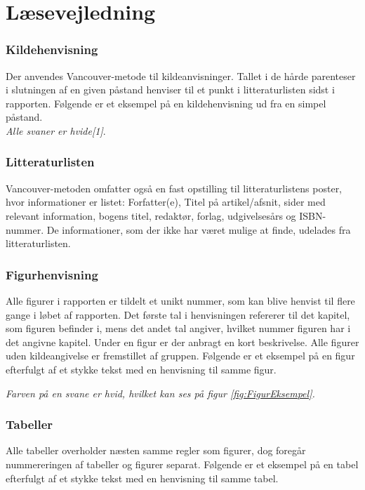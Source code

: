 \section*{Læsevejledning}
\label{sec:laesevejledning}

\subsubsection*{Kildehenvisning}
Der anvendes Vancouver-metode til kildeanvisninger. Tallet i de hårde parenteser i slutningen af en given påstand henviser til et punkt i litteraturlisten sidst i rapporten. Følgende er et eksempel på en kildehenvisning ud fra en simpel påstand.\\

\noindent \textit{Alle svaner er hvide\emph{[1]}}.

\subsubsection*{Litteraturlisten}
Vancouver-metoden omfatter også en fast opstilling til litteraturlistens poster, hvor informationer er listet: Forfatter(e), Titel på artikel/afsnit, sider med relevant information, bogens titel, redaktør, forlag, udgivelsesårs og ISBN-nummer. De informationer, som der ikke har været mulige at finde, udelades fra litteraturlisten.

\subsubsection*{Figurhenvisning}
Alle figurer i rapporten er tildelt et unikt nummer, som kan blive henvist til flere gange i løbet af rapporten. Det første tal i henvisningen refererer til det kapitel, som figuren befinder i, mens det andet tal angiver, hvilket nummer figuren har i det angivne kapitel. Under en figur er der anbragt en kort beskrivelse. Alle figurer uden kildeangivelse er fremstillet af gruppen. Følgende er et eksempel på en figur efterfulgt af et stykke tekst med en henvisning til samme figur.


\noindent \textit{Farven på en svane er hvid, hvilket kan ses på figur \ref{fig:FigurEksempel}.}

\subsubsection*{Tabeller}
Alle tabeller overholder næsten samme regler som figurer, dog foregår nummereringen af tabeller og figurer separat. Følgende er et eksempel på en tabel efterfulgt af et stykke tekst med en henvisning til samme tabel.

